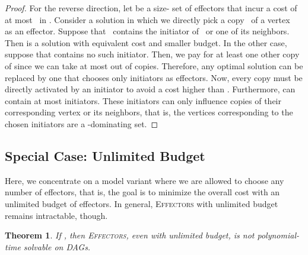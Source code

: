 \documentclass{article}
\newtheorem{theorem}{Theorem}
\newcommand{\probEffectors}{\textsc{Effectors}\xspace}
\begin{document}
\begin{proof}
  For the reverse direction, let  be a size- set of effectors
  that incur a cost of at most~ in . Consider a solution in which we directly
  pick a copy~ of a vertex~ as an effector. Suppose that~ contains the initiator of~ or one of its neighbors. 
  Then  is a solution with equivalent cost and smaller budget. In the other case, suppose that  contains no such initiator. Then, we pay for at least
  one other copy of  since we can take at most  out of 
  copies.
  Therefore, any optimal solution can be replaced by one that chooses
  only initiators as effectors. Now, every copy must be directly
  activated by an initiator to avoid a cost higher than . 
  Furthermore,  can contain at most  initiators. These initiators can 
  only influence copies of their corresponding vertex or its neighbors,  
  that is, the vertices corresponding to the chosen initiators are a
  -dominating set.   
\end{proof}

\subsection{Special Case: Unlimited Budget}\label{section:infiniteBudget}
Here, we concentrate on a model variant where we are allowed to choose any number of effectors,
that is, the goal is to minimize the overall cost with an unlimited budget of effectors.
In general, \probEffectors with unlimited budget remains intractable, though.

\begin{theorem}\label{thm:inftyNP}
  If ,
  then \probEffectors, even with unlimited budget, is not
  polynomial-time solvable on DAGs.
\end{theorem}
\end{document}
